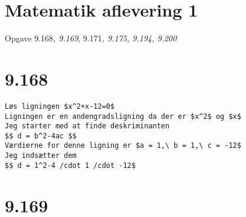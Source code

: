 \section{Matematik aflevering 1}\label{matematik-aflevering-1}

Opgave 9.168\emph{, 9.169}, 9.171\emph{, 9.175, 9.194, 9.200}

\section{9.168}\label{section}

\begin{verbatim}
Løs ligningen $x^2+x-12=0$
Ligningen er en andengradsligning da der er $x^2$ og $x$
Jeg starter med at finde deskriminanten
$$ d = b^2-4ac $$
Værdierne for denne ligning er $a = 1,\ b = 1,\ c = -12$
Jeg indsætter dem
$$ d = 1^2-4 /cdot 1 /cdot -12$
\end{verbatim}

\section{9.169}\label{section-1}
